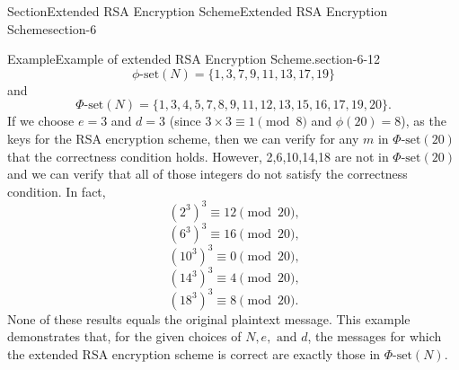 \documentclass[oneside,12pt,]{article}
\numberwithin{equation}{section}
\begin{document}
\begin{sectionptx}{Section}{Extended RSA Encryption Scheme}{}{Extended RSA Encryption Scheme}{}{}{section-6}
\begin{example}{Example}{Example of extended RSA Encryption Scheme.}{section-6-12}
\begin{equation*}
\phi\text{-set}(N) = \{1,3,7,9,11,13,17,19\}
\end{equation*}
and%
\begin{equation*}
\Phi\text{-set}(N) = \{1,3,4,5,7,8,9,11,12,13,15,16,17,19,20\}\text{.}
\end{equation*}
If we choose \(e = 3\) and \(d = 3\) (since \(3 \times 3 \equiv 1 \pmod{8}\) and \(\phi(20) = 8\)), as the keys for the RSA encryption scheme, then we can verify for any \(m\) in \(\Phi\text{-set}(20)\) that the correctness condition holds. However, \textbraceleft{}2,6,10,14,18\textbraceright{} are not in \(\Phi\text{-set}(20)\) and we can verify that all of those integers do not satisfy the correctness condition. In fact,%
\begin{equation*}
(2^3)^3 \equiv 12 \pmod{20}\text{,}
\end{equation*}
%
\begin{equation*}
(6^3)^3 \equiv 16 \pmod{20}\text{,}
\end{equation*}
%
\begin{equation*}
(10^3)^3 \equiv 0 \pmod{20}\text{,}
\end{equation*}
%
\begin{equation*}
(14^3)^3 \equiv 4 \pmod{20}\text{,}
\end{equation*}
%
\begin{equation*}
(18^3)^3 \equiv 8 \pmod{20}\text{.}
\end{equation*}
None of these results equals the original plaintext message. This example demonstrates that, for the given choices of \(N, e, \text{ and } d\), the messages for which the extended RSA encryption scheme is correct are exactly those in \(\Phi\text{-set}(N)\).%
\end{example}
\end{sectionptx}
%
%
\typeout{************************************************}
\typeout{************************************************}
%
\end{document}
